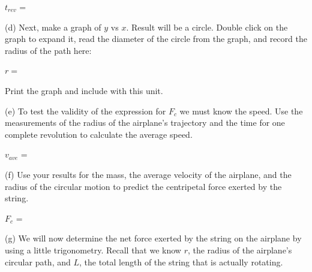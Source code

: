 \hspace{0.5in} \( t_{rev} \) = 
\vspace{5mm}


%
(d) Next, make a graph of $y$ vs $x$.  Result will be a circle. Double click on the graph to expand it, read the diameter of the circle from the graph, and record the radius of the path here:
\vspace{5mm}

\hspace{0.5in} $r =$
\vspace{5mm}

Print the graph and include with this unit.

(e) To test the validity of the expression for \( F_{c} \) we must know the
speed. Use the measurements of the radius of the airplane's trajectory and the
time for one complete revolution to calculate the average speed.
\vspace{5mm}

\hspace{0.5in} \( v_{ave} \) = 
\vspace{5mm}

(f) Use your results for the mass, the average velocity of the airplane, and
the radius of the circular motion to predict the centripetal force exerted by
the string.
\vspace{5mm}

\hspace{0.5in} \( F_{c} \) = 
\vspace{5mm}

(g) We will now determine the net force exerted by the string on the airplane
by using a little trigonometry.
Recall that we know $r$, the radius of the airplane's circular path, and 
$L$, the total length of the string that is actually rotating. 

